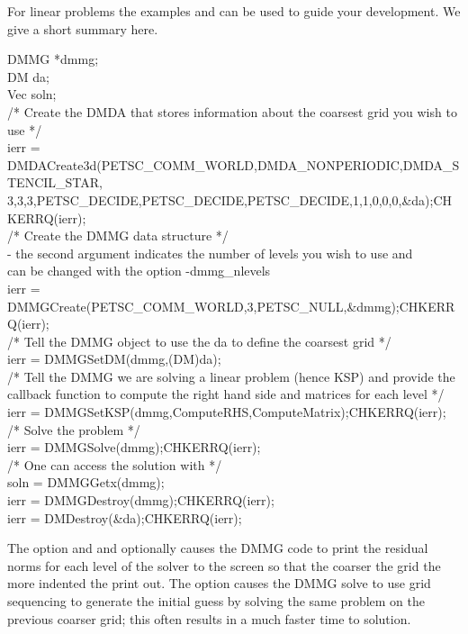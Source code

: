 For linear problems the examples  and  can be used
to guide your development. We give a short summary here.
\begin{tabbing}
  DMMG        *dmmg;\\
  DM          da;\\
  Vec         soln;\\

  /* Create the DMDA that stores information about the coarsest grid you wish to use */\\
  ierr = DMDACreate3d(PETSC\_COMM\_WORLD,DMDA\_NONPERIODIC,DMDA\_STENCIL\_STAR,\\
         3,3,3,PETSC\_DECIDE,PETSC\_DECIDE,PETSC\_DECIDE,1,1,0,0,0,\&da);CHKERRQ(ierr);\\

  /* Create the DMMG data structure */\\
       - the second argument indicates the number of levels you wish to use and \\
         can be changed with the option -dmmg\_nlevels \\
  ierr = DMMGCreate(PETSC\_COMM\_WORLD,3,PETSC\_NULL,\&dmmg);CHKERRQ(ierr);\\

  /*  Tell the DMMG object to use the da to define the coarsest grid */\\
  ierr = DMMGSetDM(dmmg,(DM)da);\\

  /*  Tell the DMMG we are solving a linear problem (hence KSP) and provide the \\
      callback function to compute the right hand side and matrices for each level */\\
  ierr = DMMGSetKSP(dmmg,ComputeRHS,ComputeMatrix);CHKERRQ(ierr);\\

  /*  Solve the problem */\\
  ierr = DMMGSolve(dmmg);CHKERRQ(ierr);\\

  /*  One can access the solution with */\\
  soln = DMMGGetx(dmmg);\\

  ierr = DMMGDestroy(dmmg);CHKERRQ(ierr);\\
  ierr = DMDestroy(\&da);CHKERRQ(ierr);\\
\end{tabbing}
The option   and  and optionally  
 causes the DMMG code to print the residual norms for each level of the solver to the screen so that
the coarser the grid the more indented the print out. The option   causes the 
DMMG solve to use grid sequencing to generate the initial guess by solving the same problem on the previous coarser grid; this often
results in a much faster time to solution.

